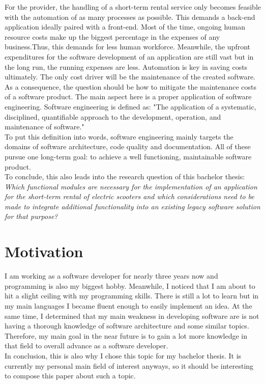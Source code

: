 \documentclass[12pt,a4paper]{report}
\begin{document}
For the provider, the handling of a short-term rental service
only becomes feasible with the automation of as many processes as possible.
This demands a back-end application ideally paired with a front-end.
Most of the time, ongoing human resource costs make up the biggest percentage
in the expenses of any business.\cn Thus, this demands for less human workforce.
Meanwhile, the upfront expenditures for the software development of
an application are still vast but in the long run, the running expenses are less.
Automation is key in saving costs ultimately. The only cost driver will be the
maintenance of the created software.\\
As a consequence, the question should be how to mitigate the maintenance costs
of a software product. The main aspect here is a proper application of software engineering.
Software engineering is defined as: "The application of a systematic, disciplined,
quantifiable approach to the development, operation, and maintenance of software."~\cite{se-ieee}\\
To put this definition into words, software engineering mainly targets
the domains of software architecture, code quality and documentation.
All of these pursue one long-term goal: to achieve a well functioning, maintainable
software product.\\
To conclude, this also leads into the research question of this bachelor thesis:\\
\emph{Which functional modules are necessary for the implementation of an application
for the short-term rental of electric scooters and which considerations need to be made
to integrate additional functionality into an existing legacy software solution for that purpose?}


\section{Motivation}

I am working as a software developer for nearly three years now and programming
is also my biggest hobby. Meanwhile, I noticed that I am about to hit a slight
ceiling with my programming skills. There is still a lot to learn but in my main
languages I became fluent enough to easily implement an idea.
At the same time, I determined that my main weakness in developing software are
is not having a thorough knowledge of software architecture and some similar topics.
Therefore, my main goal in the near future is to gain a lot more knowledge in that field
to overall advance as a software developer.\\
In conclusion, this is also why I chose this topic for my bachelor thesis.
It is currently my personal main field of interest anyways, so it should be
interesting to compose this paper about such a topic.
\end{document}
